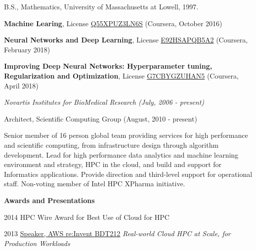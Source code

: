 \documentclass[11pt,article,oneside]{memoir}
\begin{document}
\ind B.S., Mathematics, University of Massachusetts at Lowell, 1997.

\bigskip


\ind \textbf{Machine Learing}, License \href{https://www.coursera.org/account/accomplishments/verify/Q55XPUZ3LN6S}{Q55XPUZ3LN6S} (Coursera, October 2016)

\ind \textbf{Neural Networks and Deep Learning}, License \href{https://www.coursera.org/account/accomplishments/verify/E92HSAPQB5A2}{E92HSAPQB5A2} (Coursera, February 2018)

\ind \textbf{Improving Deep Neural Networks: Hyperparameter tuning, Regularization and Optimization}, License \href{Improving Deep Neural Networks: Hyperparameter tuning, Regularization and Optimization}{G7CBYGZUHAN5} (Coursera, April 2018)
\bigskip

\medskip
\noindent\emph{Novartis Institutes for BioMedical Research (July, 2006 - present) \vspace{0.01in}}

\ind \footnotesize Architect, Scientific Computing Group (August, 2010 - present)


\ind \hspace{0.35in} \footnotesize Senior member of 16 person global team providing services for high performance and scientific computing, from infrastructure design through algorithm development. Lead for high performance data analytics and machine learning environment and strategy, HPC in the cloud, and build and support for Informatics applications. Provide direction and third-level support for operational staff. Non-voting member of Intel HPC XPharma initiative.

\medskip
\ind \hspace{0.35in} \footnotesize \textbf{Awards and Presentations}

\ind \hspace{0.35in} \footnotesize 2014 HPC Wire Award for Best Use of Cloud for HPC

\ind \hspace{0.35in} \footnotesize 2013 \href{https://www.youtube.com/watch?v=--ALfYpw_aM}{Speaker, AWS re:Invent BDT212} \emph{Real-world Cloud HPC at Scale, for Production Workloads}
\end{document}
